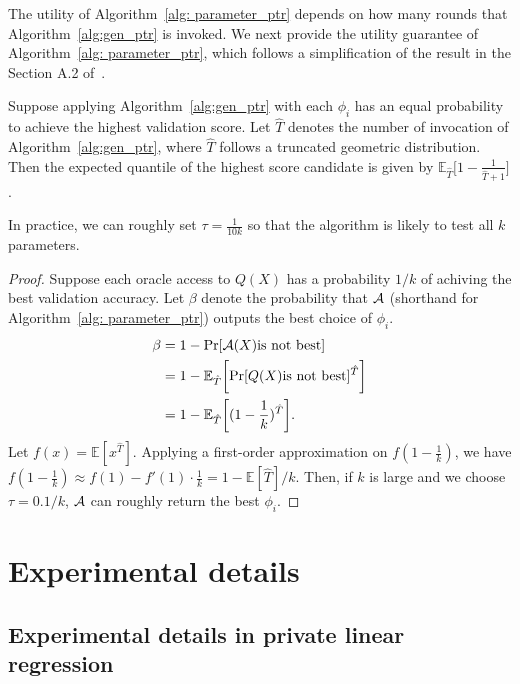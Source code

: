 The utility of Algorithm~\ref{alg: parameter_ptr}
depends on how many rounds that Algorithm~\ref{alg:gen_ptr} is invoked. We next provide the utility guarantee of Algorithm~\ref{alg: parameter_ptr}, which follows a simplification of the result in the Section A.2 of~\citet{papernot2021hyperparameter}.
\begin{theorem}
 Suppose applying Algorithm~\ref{alg:gen_ptr} with each $\phi_i$ has an equal probability to achieve the highest validation score. Let $\hat{T}$ denotes the number of invocation of Algorithm~\ref{alg:gen_ptr}, where $\hat{T}$ follows a truncated geometric distribution. Then the expected quantile of the highest score candidate is given by $\mathbb{E}_{\hat{T}}\bigg[1 -\frac{1}{\hat{T}+1}\bigg]$.
\end{theorem}

In practice, we can roughly set $\tau = \frac{1}{10k}$ so that the algorithm is likely to test all $k$ parameters. 



\begin{proof}
 Suppose each oracle access to $Q(X)$ has a probability $1/k$ of achiving the best validation accuracy. Let $\beta$ denote the probability that $\mathcal{A}$ (shorthand for Algorithm~\ref{alg: parameter_ptr}) outputs the best choice of $\phi_i$. 
 \begin{align*}
 \beta &= 1-\mathrm{Pr}[\mathcal{A}(X) \text{is not best}] \\ &=1- \mathbb{E}_{\hat{T}}\bigg[\mathrm{Pr}[Q(X) \text{is not best}]^{\hat{T}}\bigg] \\ &= 1 -\mathbb{E}_{\hat{T}}\bigg[ (1-\frac{1}{k})^{\hat{T}}\bigg].
 \end{align*}
 Let $f(x)=\mathbb{E}[x^{\hat{T}}]$. Applying a first-order approximation on $f(1-\frac{1}{k})$, we have $f(1-\frac{1}{k})\approx f(1) -f'(1) \cdot \frac{1}{k}=1-\mathbb{E}[\hat{T}]/k$. Then, if $k$ is large and we choose $\tau=0.1/k$, $\mathcal{A}$ can roughly return the best $\phi_i$.
\end{proof}

\section{Experimental details}

\subsection{Experimental details in private linear regression}

